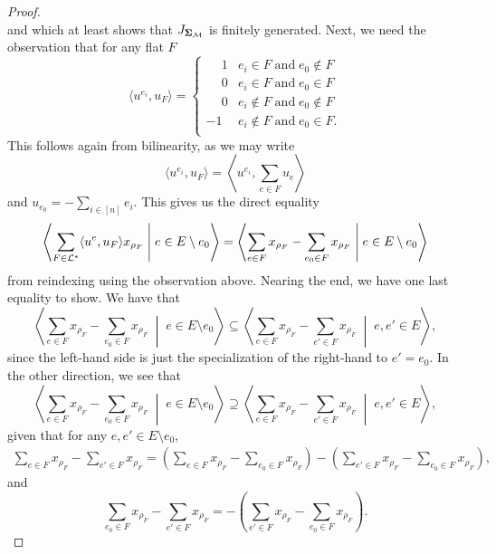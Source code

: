 \documentclass[12pt,oneside]{../../sfsuthesis}
\begin{document}
\begin{proof}
\[    \]
    and which at least shows that \( J_{{\bm{\Sigma}}_{\mathcal{M}}} \) is finitely generated.
    Next, we need the observation that for any flat \( F \)
    \[
        \langle u^{e_i}, u_F \rangle =
        \begin{cases}
            \phantom{-}1 & e_i \in F \; \text{and} \; e_0 \notin F    \\
            \phantom{-}0 & e_i \in F \; \text{and} \; e_0 \in F       \\
            \phantom{-}0 & e_i \notin F \; \text{and} \; e_0 \notin F \\
            -1           & e_i \notin F \; \text{and} \; e_0 \in F.   \\
        \end{cases}
    \]
    This follows again from bilinearity, as we may write
    \[
        \langle u^{e_i}, u_F \rangle =  \left\langle u^{e_i}, \sum_{e \in F} u_{e} \right\rangle
    \]
    and \( u_{e_0} = - \sum_{i \in [n]} e_i \).
    This gives us the direct equality
    \[
        \left\langle \sum_{F \in \mathcal{L}^\ast} \langle u^e, u_F \rangle x_{\rho_F} \; \middle| \; e \in E \setminus e_0   \right\rangle
        = \left\langle \sum_{e \in F} x_{\rho_F} - \sum_{e_0 \in F} x_{\rho_F} \; \middle| \; e \in E \setminus e_0   \right\rangle
    \]
    from reindexing using the observation above.
    Nearing the end, we have one last equality to show.
    We have that
    \[
        \left\langle \sum_{e \in F} x_{\rho_F} - \sum_{e_0 \in F} x_{\rho_F} \; \middle| \; e \in E \setminus e_0   \right\rangle
        \subseteq \left\langle \sum_{e \in F} x_{\rho_F} - \sum_{e' \in F} x_{\rho_F} \; \middle| \; e, e' \in E   \right\rangle,
    \]
    since the left-hand side is just the specialization of the right-hand to \( e' = e_0 \).
    In the other direction, we see that
    \[
        \left\langle \sum_{e \in F} x_{\rho_F} - \sum_{e_0 \in F} x_{\rho_F} \; \middle| \; e \in E \setminus e_0   \right\rangle
        \supseteq \left\langle \sum_{e \in F} x_{\rho_F} - \sum_{e' \in F} x_{\rho_F} \; \middle| \; e, e' \in E   \right\rangle,
    \]
    given that for any \( e, e' \in E \setminus e_0\),
    \begin{gather*}
        \sum_{e \in F} x_{\rho_F} - \sum_{e' \in F} x_{\rho_F} =
        \left(\sum_{e \in F} x_{\rho_F} - \sum_{e_0 \in F} x_{\rho_F} \right) - \left( \sum_{e' \in F} x_{\rho_F} - \sum_{e_0 \in F} x_{\rho_F} \right),
    \end{gather*}
    and
    \[
        \sum_{e_0 \in F} x_{\rho_F} - \sum_{e' \in F} x_{\rho_F} = - \left( \sum_{e' \in F} x_{\rho_F} - \sum_{e_0 \in F} x_{\rho_F} \right).
    \]


\end{proof}
\end{document}
